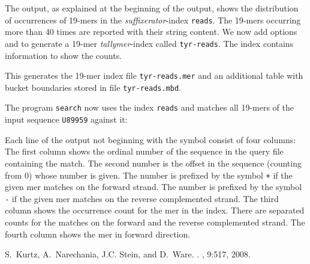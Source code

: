 \documentclass[12pt]{article}
\newcommand{\Programname}[1]{\texttt{\small #1}}
\newcommand{\TYsearch}[0]{\Programname{search}\xspace}
\newcommand{\SFXidx}[0]{\textit{suffixerator}-index\xspace}
\newcommand{\Tyridx}[0]{\textit{tallymer}-index\xspace}
\begin{document}
The output, as explained at the beginning of the output, shows the
distribution of occurrences of 19-mers in the \SFXidx
\texttt{reads}. The 19-mers occurring more
than 40 times are reported with their string content.
We now add options  and  to
generate a 19-mer \Tyridx called \texttt{tyr-reads}. The index contains
information to show the counts.


This generates the 19-mer index file \texttt{tyr-reads.mer} and an additional
table with bucket boundaries stored in file \texttt{tyr-reads.mbd}.

The program \TYsearch now uses the index \texttt{reads} and
matches all 19-mers of the input sequence \texttt{U89959} against it:


Each line of the output not beginning with the symbol \texttt{}
consist of four columns: The first column shows the ordinal number of the
sequence in the query file containing the match. The second number
is the offset in the sequence (counting from 0) whose number is given.
The number is prefixed by the symbol \texttt{+} if the given mer
matches on the forward strand.
The number is prefixed by the symbol \texttt{-} if the given mer
matches on the reverse complemented strand. The third column shows
the occurrence count for the mer in the index. There are separated
counts for the matches on the forward and the reverse complemented strand.
The fourth column shows the mer in forward direction.
%
%
\begin{thebibliography}{1}
S.~Kurtz, A.~Narechania, J.C. Stein, and D.~Ware.
.
, 9:517, 2008.
\end{thebibliography}

\appendix
\end{document}
